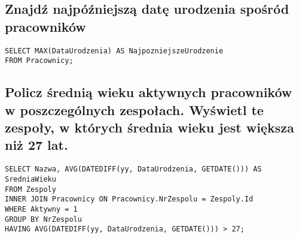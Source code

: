 \documentclass{article}
\begin{document}
\subsection{Znajdź najpóźniejszą datę urodzenia spośród pracowników}
\begin{verbatim}
SELECT MAX(DataUrodzenia) AS NajpozniejszeUrodzenie
FROM Pracownicy;
\end{verbatim}

\subsection{Policz średnią wieku aktywnych pracowników w poszczególnych zespołach. Wyświetl te zespoły, w których średnia wieku jest większa niż 27 lat.}

\begin{verbatim}
SELECT Nazwa, AVG(DATEDIFF(yy, DataUrodzenia, GETDATE())) AS SredniaWieku
FROM Zespoly
INNER JOIN Pracownicy ON Pracownicy.NrZespolu = Zespoly.Id
WHERE Aktywny = 1
GROUP BY NrZespolu
HAVING AVG(DATEDIFF(yy, DataUrodzenia, GETDATE())) > 27;
\end{verbatim}
\end{document}
